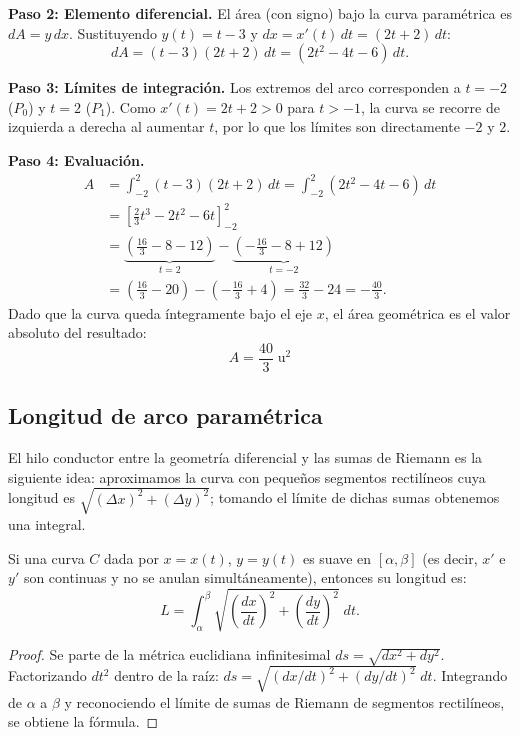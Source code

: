\begin{example}
\begin{myproof}
\textbf{Paso 2: Elemento diferencial.}
El área (con signo) bajo la curva paramétrica es $dA = y\,dx$.
Sustituyendo $y(t) = t-3$ y $dx = x'(t)\,dt = (2t+2)\,dt$:
\[
  dA = (t-3)(2t+2)\,dt = (2t^2 - 4t - 6)\,dt.
\]

\textbf{Paso 3: Límites de integración.}
Los extremos del arco corresponden a $t = -2$ ($P_0$) y $t = 2$ ($P_1$).
Como $x'(t) = 2t+2 > 0$ para $t > -1$, la curva se recorre de izquierda a
derecha al aumentar $t$, por lo que los límites son directamente $-2$ y $2$.

\textbf{Paso 4: Evaluación.}
\begin{align*}
A &= \int_{-2}^{2} (t-3)(2t+2)\,dt
   = \int_{-2}^{2} (2t^2 - 4t - 6)\,dt \\[4pt]
  &= \left[\frac{2}{3}t^3 - 2t^2 - 6t\right]_{-2}^{2} \\[6pt]
  &= \underbrace{\left(\frac{16}{3} - 8 - 12\right)}_{t=2}
     - \underbrace{\left(-\frac{16}{3} - 8 + 12\right)}_{t=-2} \\[4pt]
  &= \left(\frac{16}{3} - 20\right) - \left(-\frac{16}{3} + 4\right)
   = \frac{32}{3} - 24 = -\frac{40}{3}.
\end{align*}
Dado que la curva queda íntegramente bajo el eje $x$, el área geométrica es
el valor absoluto del resultado:
\[
  \boxed{A = \frac{40}{3}\;\text{u}^2}
\]
\end{myproof}
\end{example}

\subsection{Longitud de arco paramétrica}

El hilo conductor entre la geometría diferencial y las sumas de
Riemann es la siguiente idea: aproximamos la curva con pequeños segmentos
rectilíneos cuya longitud es $\sqrt{(\Delta x)^2 + (\Delta y)^2}$; tomando
el límite de dichas sumas obtenemos una integral.

\begin{theorem}
Si una curva $C$ dada por $x = x(t)$, $y = y(t)$ es suave en $[\alpha,\beta]$
(es decir, $x'$ e $y'$ son continuas y no se anulan simultáneamente),
entonces su longitud es:
\[
  L = \int_{\alpha}^{\beta}
      \sqrt{\!\left(\frac{dx}{dt}\right)^{\!2}
           +\left(\frac{dy}{dt}\right)^{\!2}}\;dt.
\]
\begin{proof}
Se parte de la métrica euclidiana infinitesimal
$ds = \sqrt{dx^2 + dy^2}$.
Factorizando $dt^2$ dentro de la raíz:
$ds = \sqrt{(dx/dt)^2 + (dy/dt)^2}\;dt$.
Integrando de $\alpha$ a $\beta$ y reconociendo el límite de sumas de
Riemann de segmentos rectilíneos, se obtiene la fórmula.
\end{proof}
\end{theorem}

